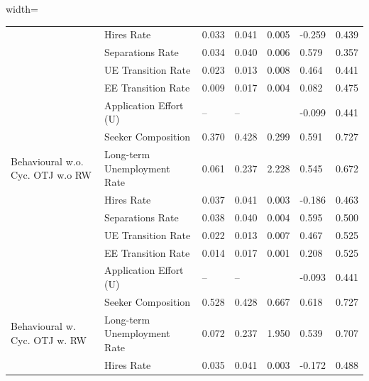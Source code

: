 \begin{adjustbox}{width=\textwidth}
\begin{tabular}{lllllll}
\cellcolor{modelBehaviouralwCycOTJwoRW!25} & Hires Rate & 0.033 & 0.041 & 0.005 & \cellcolor{green!40!yellow!25}-0.259 & 0.439 \\
\cellcolor{modelBehaviouralwCycOTJwoRW!25} & Separations Rate & 0.034 & 0.040 & 0.006 & \cellcolor{red!25}0.579 & 0.357 \\
\cellcolor{modelBehaviouralwCycOTJwoRW!25} & UE Transition Rate & 0.023 & 0.013 & 0.008 & \cellcolor{green!70!yellow!25}0.464 & 0.441 \\
\cellcolor{modelBehaviouralwCycOTJwoRW!25} & EE Transition Rate & 0.009 & 0.017 & 0.004 & \cellcolor{yellow!25}0.082 & 0.475 \\
\cellcolor{modelBehaviouralwCycOTJwoRW!25} & Application Effort (U) & -- & -- &  & \cellcolor{green!70!yellow!25}-0.099 & 0.441 \\
\cellcolor{modelBehaviouralwCycOTJwoRW!25} & Seeker Composition & 0.370 & 0.428 & 0.299 & \cellcolor{orange!25}0.591 & 0.727 \\
\cellcolor{modelBehaviouralwoCycOTJwoRW!25}Behavioural w.o. Cyc. OTJ w.o RW & Long-term Unemployment Rate & 0.061 & 0.237 & 2.228 & \cellcolor{green!25}0.545 & 0.672 \\
\cellcolor{modelBehaviouralwoCycOTJwoRW!25} & Hires Rate & 0.037 & 0.041 & 0.003 & \cellcolor{green!70!yellow!25}-0.186 & 0.463 \\
\cellcolor{modelBehaviouralwoCycOTJwoRW!25} & Separations Rate & 0.038 & 0.040 & 0.004 & \cellcolor{green!70!yellow!25}0.595 & 0.500 \\
\cellcolor{modelBehaviouralwoCycOTJwoRW!25} & UE Transition Rate & 0.022 & 0.013 & 0.007 & \cellcolor{green!25}0.467 & 0.525 \\
\cellcolor{modelBehaviouralwoCycOTJwoRW!25} & EE Transition Rate & 0.014 & 0.017 & 0.001 & \cellcolor{green!25}0.208 & 0.525 \\
\cellcolor{modelBehaviouralwoCycOTJwoRW!25} & Application Effort (U) & -- & -- &  & \cellcolor{green!25}-0.093 & 0.441 \\
\cellcolor{modelBehaviouralwoCycOTJwoRW!25} & Seeker Composition & 0.528 & 0.428 & 0.667 & \cellcolor{yellow!25}0.618 & 0.727 \\
\cellcolor{modelBehaviouralwCycOTJwRW!25}Behavioural w. Cyc. OTJ w. RW & Long-term Unemployment Rate & 0.072 & 0.237 & 1.950 & \cellcolor{green!40!yellow!25}0.539 & 0.707 \\
\cellcolor{modelBehaviouralwCycOTJwRW!25} & Hires Rate & 0.035 & 0.041 & 0.003 & \cellcolor{green!25}-0.172 & 0.488 \\

\end{tabular}
\end{adjustbox}
